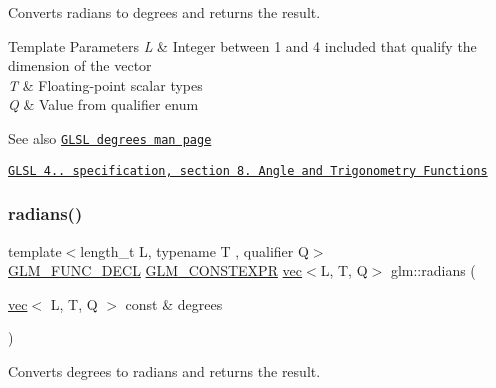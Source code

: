 Converts radians to degrees and returns the result.


\begin{DoxyTemplParams}{Template Parameters}
{\em L} & Integer between 1 and 4 included that qualify the dimension of the vector \\
\hline
{\em T} & Floating-\/point scalar types \\
\hline
{\em Q} & Value from qualifier enum\\
\hline
\end{DoxyTemplParams}
\begin{DoxySeeAlso}{See also}
\href{http://www.opengl.org/sdk/docs/manglsl/xhtml/degrees.xml}{\tt G\+L\+SL degrees man page} 

\href{http://www.opengl.org/registry/doc/GLSLangSpec.4.20.8.pdf}{\tt G\+L\+SL 4.. specification, section 8. Angle and Trigonometry Functions} 
\end{DoxySeeAlso}
\mbox{\label{group__core__func__trigonometric_ga6e1db4862c5e25afd553930e2fdd6a68}} 
\subsubsection{\texorpdfstring{radians()}{radians()}}
{\footnotesize\ttfamily template$<$length\+\_\+t L, typename T , qualifier Q$>$ \\
\mbox{\hyperlink{setup_8hpp_ab2d052de21a70539923e9bcbf6e83a51}{G\+L\+M\+\_\+\+F\+U\+N\+C\+\_\+\+D\+E\+CL}} \mbox{\hyperlink{setup_8hpp_a08b807947b47031d3a511f03f89645ad}{G\+L\+M\+\_\+\+C\+O\+N\+S\+T\+E\+X\+PR}} \mbox{\hyperlink{structglm_1_1vec}{vec}}$<$L, T, Q$>$ glm\+::radians (\begin{DoxyParamCaption}\item[{\mbox{\hyperlink{structglm_1_1vec}{vec}}$<$ L, T, Q $>$ const \&}]{degrees }\end{DoxyParamCaption})}

Converts degrees to radians and returns the result.


